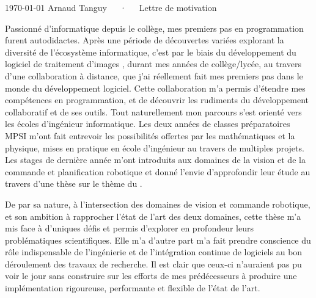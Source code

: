 \documentclass[11pt, a4paper]{awesome-cv}
\begin{document}
\makecvheader[R]

\makecvfooter
  {\today}
  {Arnaud Tanguy~~~·~~~Lettre de motivation}
  {}

\makelettertitle

\begin{cvletter}

Passionné d'informatique depuis le collège, mes premiers pas en programmation furent autodidactes. Après une période de découvertes variées explorant la diversité de l'écosystème informatique, c'est par le biais du développement du logiciel  de traitement d'images , durant mes années de collège/lycée, au travers d'une collaboration à distance, que j'ai réellement fait mes premiers pas dans le monde du développement logiciel. Cette collaboration m'a permis d'étendre mes compétences en programmation, et de découvrir les rudiments du développement collaboratif et de ses outils. Tout naturellement mon parcours s'est orienté vers les écoles d'ingénieur informatique. Les deux années de classes préparatoires MPSI m'ont fait entrevoir les possibilités offertes par les mathématiques et la physique, mises en pratique en école d'ingénieur au travers de multiples projets. Les stages de dernière année m'ont introduits aux domaines de la vision et de la commande et planification robotique et donné l'envie d'approfondir leur étude au travers d'une thèse sur le thème du .

De par sa nature, à l'intersection des domaines de vision et commande robotique, et son ambition à rapprocher l'état de l'art des deux domaines, cette thèse m'a mis face à d'uniques défis et permis d'explorer en profondeur leurs problématiques scientifiques. Elle m'a d'autre part m'a fait prendre conscience du rôle indispensable de l'ingénierie et de l'intégration continue de logiciels au bon déroulement des travaux de recherche. Il est clair que ceux-ci n'auraient pas pu voir le jour sans construire sur les efforts de mes prédécesseurs à produire une implémentation rigoureuse, performante et flexible de l'état de l'art.


\end{cvletter}
\end{document}
